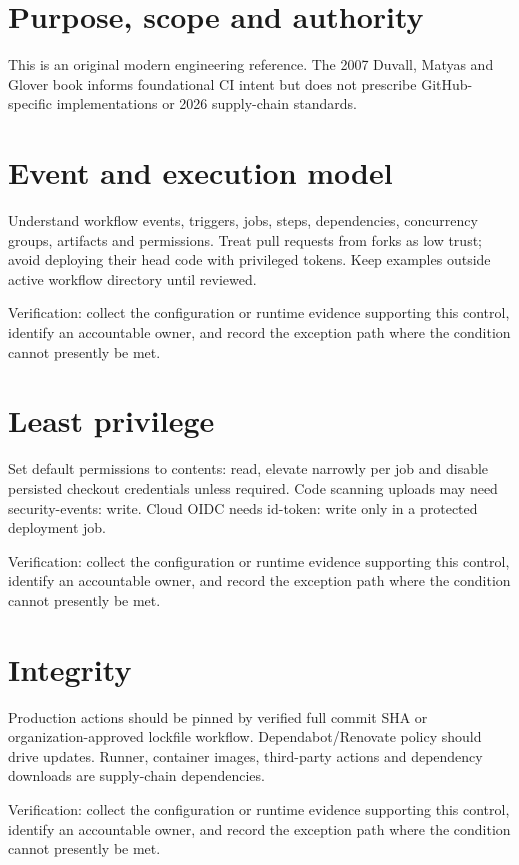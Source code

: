 \documentclass[11pt,letterpaper]{article}
\begin{document}
\makedoctitle
\makedocsummary
\tableofcontents
\clearpage
\section{Purpose, scope and authority}
This is an original modern engineering reference. The 2007 Duvall, Matyas and Glover book informs foundational CI intent but does not prescribe GitHub-specific implementations or 2026 supply-chain standards.

\section{Event and execution model}
Understand workflow events, triggers, jobs, steps, dependencies, concurrency groups, artifacts and permissions. Treat pull requests from forks as low trust; avoid deploying their head code with privileged tokens. Keep examples outside active workflow directory until reviewed.

Verification: collect the configuration or runtime evidence supporting this control, identify an accountable owner, and record the exception path where the condition cannot presently be met.

\section{Least privilege}
Set default permissions to contents: read, elevate narrowly per job and disable persisted checkout credentials unless required. Code scanning uploads may need security-events: write. Cloud OIDC needs id-token: write only in a protected deployment job.

Verification: collect the configuration or runtime evidence supporting this control, identify an accountable owner, and record the exception path where the condition cannot presently be met.

\section{Integrity}
Production actions should be pinned by verified full commit SHA or organization-approved lockfile workflow. Dependabot/Renovate policy should drive updates. Runner, container images, third-party actions and dependency downloads are supply-chain dependencies.

Verification: collect the configuration or runtime evidence supporting this control, identify an accountable owner, and record the exception path where the condition cannot presently be met.
\end{document}
